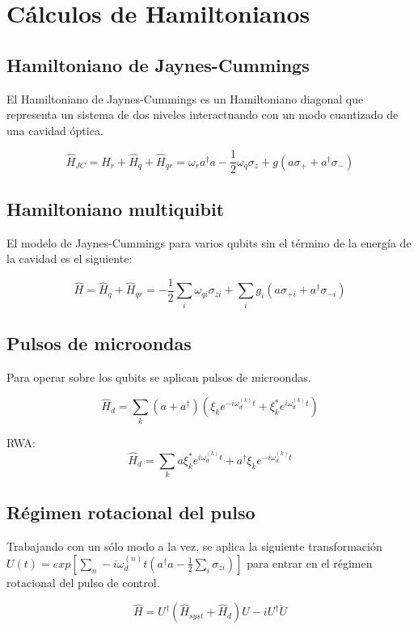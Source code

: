 \chapter{Cálculos de Hamiltonianos}

\section{Hamiltoniano de Jaynes-Cummings}

El Hamiltoniano de Jaynes-Cummings es un Hamiltoniano diagonal que representa un
sistema de dos niveles interactuando con un modo cuantizado de una cavidad óptica.

$$\hat{H}_{JC} = \hat{H}_r + \hat{H}_q + \hat{H}_{qr} = \omega_r a^\dag a - \frac{1}{2} \omega_q \sigma_z + g(a \sigma_+ + a^\dag \sigma_-)$$

\section{Hamiltoniano multiquibit}

El modelo de Jaynes-Cummings para varios qubits sin el término de la energía de la cavidad es el siguiente:

$$\hat{H} = \hat{H}_q + \hat{H}_{qr} = - \frac{1}{2} \sum\limits_i \omega_{qi} \sigma_{zi} + \sum\limits_i g_i (a \sigma_{+ i} + a^\dagger \sigma_{- i})$$

\section{Pulsos de microondas}

Para operar sobre los qubits se aplican pulsos de microondas.

$$\hat{H}_d = \sum\limits_k (a+a^\dagger) (\xi_k e^{-i\omega_d^{(k)}t} + \xi_k^*e^{i\omega_d^{(k)}t})$$

RWA: $$\hat{H}_d=\sum\limits_k a\xi_k^*e^{i\omega_d^{(k)}t}+ a^\dagger\xi_ke^{-i\omega_d^{(k)}t}$$

\section{Régimen rotacional del pulso}

Trabajando con un sólo modo a la vez, se aplica la siguiente transformación
$U(t) = exp[\sum\limits_n-i \omega_d^{(n)} t(a^\dagger a - \frac{1}{2} \sum\limits_i \sigma_{z i})]$ para entrar en el régimen rotacional del pulso de control.

$$\hat{H} = U^\dagger (\hat{H}_{syst} + \hat{H}_d) U - i U^\dagger \dot{U}$$

